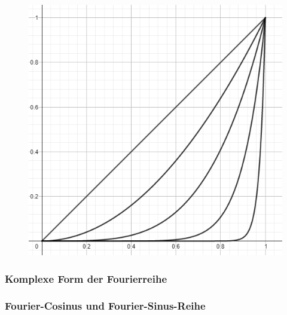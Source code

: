 \begin{figure}[H]
	\centering
	\includegraphics[width=0.4\linewidth]{Grafiken/2_Fourierreihen/Grafik4.PNG}
\end{figure}



\subsubsection{Komplexe Form der Fourierreihe}




\subsubsection{Fourier-Cosinus und Fourier-Sinus-Reihe}

